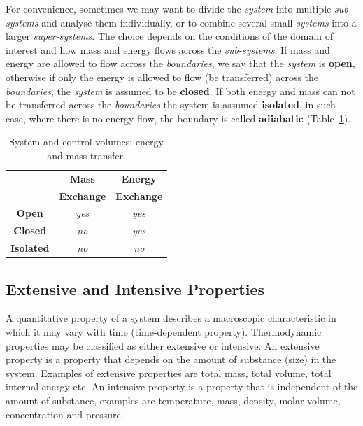 For convenience, sometimes we may want to divide the {\it system} into multiple {\it sub-systems} and analyse them individually, or to combine several small {\it systems} into a larger {\it super-systems}. The choice depends on the conditions of the domain of interest and how mass and energy flows across the {\it sub-systems}. If mass and energy are allowed to flow across the {\it boundaries}, we say that the {\it system} is {\bf open}, otherwise if only the energy is allowed to flow (\ie be transferred) across the {\it boundaries}, the {\it system} is assumed to be {\bf closed}. If both energy and mass can not be transferred across the {\it boundaries} the system is assumed {\bf isolated}, in such case, where there is no energy flow, the boundary is called {\bf adiabatic} (Table~\ref{Chapter:Introduction:Table:System}).


   \begin{table}[h]
     \begin{center}
      \begin{tabular}{|c|c|c|}
         \hline
                      & {\bf Mass} & {\bf Energy} \\
                      & {\bf Exchange} & {\bf Exchange} \\
         \hline
         {\bf Open}   & {\it yes}  & {\it yes}    \\
         {\bf Closed} & {\it no}   & {\it yes}    \\
         {\bf Isolated}&{\it no}   & {\it no}     \\
         \hline 
      \end{tabular}  \label{Chapter:Introduction:Table:System}
        \caption{System and control volumes: energy and mass transfer.}
     \end{center}
   \end{table}

\subsection{Extensive and Intensive Properties}\label{Chapter:Introduction:Section:Introduction:ExtensiveIntensiveProperties}
A quantitative property of a system describes a macroscopic characteristic in which it may vary with time (\ie time-dependent property). Thermodynamic properties may be classified as either extensive or intensive. An extensive property is a property that depends on the amount of substance (\ie size) in the system. Examples of extensive properties are total mass, total volume, total internal energy etc. An intensive property is a property that is independent of the amount of substance, examples are temperature, mass, density, molar volume, concentration and pressure.





